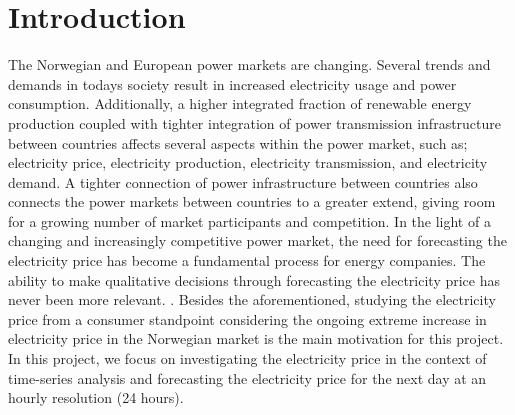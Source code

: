 \documentclass
[twocolumn,
secnumarabic,
nobibnotes,
aps,
prl,
reprint,
groupedaddress,
amsmath,
amssymb,
]{revtex4-2}
\begin{document}
\section{Introduction}
The Norwegian and European power markets are changing. Several trends and demands in todays society result in increased electricity usage and power consumption. Additionally, a higher integrated fraction of renewable energy production coupled with tighter integration of power transmission infrastructure between countries affects several aspects within the power market, such as; electricity price, electricity production, electricity transmission, and electricity demand. A tighter connection of power infrastructure between countries also connects the power markets between countries to a greater extend, giving room for a growing number of market participants and competition. In the light of a changing and increasingly competitive power market, the need for forecasting the electricity price has become a fundamental process for energy companies. The ability to make qualitative decisions through forecasting the electricity price has never been more relevant. \cite{nowotarski_recent_2018}. Besides the aforementioned, studying the electricity price from a consumer standpoint considering the ongoing extreme increase in electricity price in the Norwegian market is the main motivation for this project. In this project, we focus on investigating the electricity price in the context of time-series analysis and forecasting the electricity price for the next day at an hourly resolution (24 hours). 
\\\\
\end{document}
